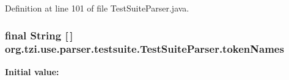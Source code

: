 Definition at line 101 of file Test\-Suite\-Parser.\-java.

\hypertarget{classorg_1_1tzi_1_1use_1_1parser_1_1testsuite_1_1_test_suite_parser_ab3d9173889a1ea426141b291af2227ce}{
\subsubsection[{token\-Names}]{\setlength{\rightskip}{0pt plus 5cm}final String \mbox{[}$\,$\mbox{]} org.\-tzi.\-use.\-parser.\-testsuite.\-Test\-Suite\-Parser.\-token\-Names\hspace{0.3cm}{\ttfamily [static]}}}\label{classorg_1_1tzi_1_1use_1_1parser_1_1testsuite_1_1_test_suite_parser_ab3d9173889a1ea426141b291af2227ce}
{\bfseries Initial value\-:}
